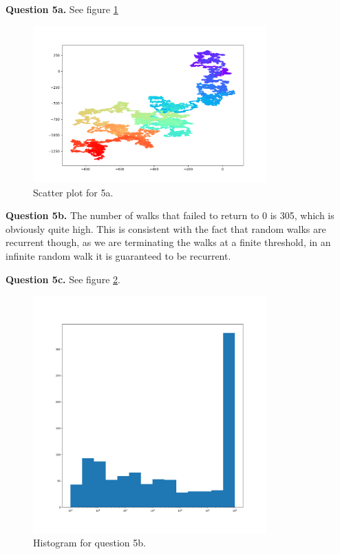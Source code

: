 \documentclass[letterpaper, reqno,11pt]{article}
\begin{document}
{\medskip\noindent\bf Question 5a.} See figure \ref{fig:5a}

\begin{figure}[htpb]
    \centering
    \includegraphics[width=0.8\textwidth]{5a}
    \caption{Scatter plot for 5a.}
    \label{fig:5a}
\end{figure}

{\medskip\noindent\bf Question 5b.} The number of walks that failed to return to 0 is 305, which is obviously quite high. This is consistent with the fact that random walks are recurrent though, as we are terminating the walks at a finite threshold, in an infinite random walk it is guaranteed to be recurrent.

{\medskip\noindent\bf Question 5c.} See figure \ref{fig:5b}.

\begin{figure}[htpb]
    \centering
    \includegraphics[width=0.8\textwidth]{5b}
    \caption{Histogram for question 5b.}
    \label{fig:5b}
\end{figure}
\end{document}
